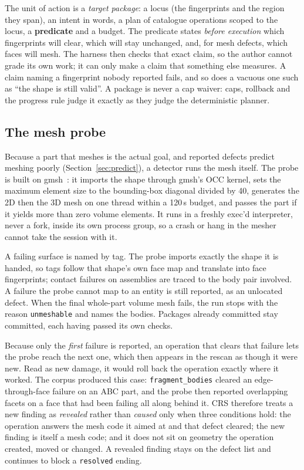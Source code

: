 \documentclass[10pt,onecolumn]{article}
\newcommand{\code}[1]{\texttt{\small #1}}
\begin{document}
The unit of action is a \emph{target package}: a locus (the fingerprints and the region they span),
an intent in words, a plan of catalogue operations scoped to the locus, a \textbf{predicate} and a
budget. The predicate states \emph{before execution} which fingerprints will clear, which will stay
unchanged, and, for mesh defects, which faces will mesh. The harness then checks that exact claim,
so the author cannot grade its own work; it can only make a claim that something else measures. A
claim naming a fingerprint nobody reported fails, and so does a vacuous one such as ``the shape is
still valid''. A package is never a cap waiver: caps, rollback and the progress rule judge it
exactly as they judge the deterministic planner.

\subsection{The mesh probe}\label{sec:probe}

Because a part that meshes is the actual goal, and reported defects predict meshing poorly
(Section~\ref{sec:predict}), a detector runs the mesh itself. The probe is built on
gmsh~\cite{gmsh}: it imports the shape through gmsh's OCC kernel, sets the maximum element size to
the bounding-box diagonal divided by 40, generates the 2D then the 3D mesh on one thread within a
120\,s budget, and passes the part if it yields more than zero volume elements. It runs in a freshly
exec'd interpreter, never a fork, inside its own process group, so a crash or hang in the mesher
cannot
take the session with it.

A failing surface is named by tag. The probe imports exactly the shape it is handed, so tags
follow that shape's own face map and translate into face fingerprints; contact failures on
assemblies are traced to the body pair involved. A failure the probe cannot map to an entity is
still reported, as an unlocated defect. When the final whole-part volume mesh fails, the run stops
with the reason \code{unmeshable} and names the bodies. Packages already committed stay committed,
each having passed its own checks.

Because only the \emph{first} failure is reported, an operation that clears that failure lets the
probe reach the next one, which then appears in the rescan as though it were new. Read as new
damage, it would roll back the operation exactly where it worked. The corpus produced this case:
\code{fragment\_bodies} cleared an edge-through-face failure on an ABC part, and the
probe then reported overlapping facets on a face that had been failing all along behind it. CRS
therefore treats a new finding as \emph{revealed} rather than \emph{caused} only when three
conditions hold: the operation answers the mesh code it aimed at and that defect cleared; the new
finding is itself a mesh code; and it does not sit on geometry the operation created, moved or
changed. A revealed finding stays on the defect list and continues to block a \code{resolved}
ending.
\end{document}
